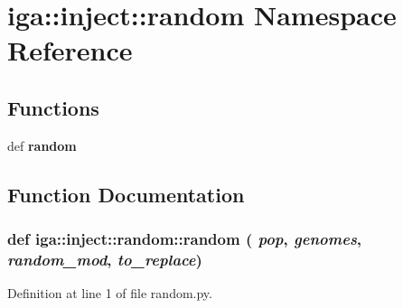 \section{iga::inject::random Namespace Reference}
\label{namespaceiga_1_1inject_1_1random}


\subsection*{Functions}
\begin{CompactItemize}
\item 
def {\bf random}
\end{CompactItemize}


\subsection{Function Documentation}
\subsubsection{\setlength{\rightskip}{0pt plus 5cm}def iga::inject::random::random ( {\em pop},  {\em genomes},  {\em random\_\-mod},  {\em to\_\-replace})}\label{namespaceiga_1_1inject_1_1random_67a7455ca51d89bf4cd75bf39dfe8497}




Definition at line 1 of file random.py.